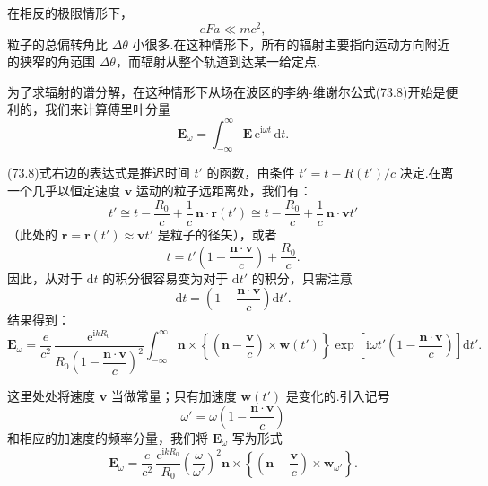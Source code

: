 在相反的极限情形下，
\begin{equation}
  eFa\ll mc^2,
\end{equation}
粒子的总偏转角比 $\Delta\theta$ 小很多.在这种情形下，所有的辐射主要指向运动方向附近的狭窄的角范围 $\Delta\theta$，而辐射从整个轨道到达某一给定点.

为了求辐射的谱分解，在这种情形下从场在波区的李纳-维谢尔公式(73.8)开始是便利的，我们来计算傅里叶分量
\begin{equation*}
  \boldsymbol{E}_{\omega}=\int_{-\infty}^{\infty}\boldsymbol{E}\,\mathrm{e}^{\mathrm{i}\omega t}\,\mathrm{d}t.
\end{equation*}

(73.8)式右边的表达式是推迟时间 $t'$ 的函数，由条件 $t'=t-R(t')/c$ 决定.在离一个几乎以恒定速度 $\boldsymbol{v}$ 运动的粒子远距离处，我们有：
\begin{equation*}
  t'\cong t-\frac{R_0}{c}+\frac{1}{c}\,\boldsymbol{n}\cdot\boldsymbol{r}(t')
  \cong t-\frac{R_0}{c}+\frac{1}{c}\,\boldsymbol{n}\cdot\boldsymbol{v}t'
\end{equation*}
（此处的 $\boldsymbol{r}=\boldsymbol{r}(t')\approx\boldsymbol{v}t'$ 是粒子的径矢），或者
\begin{equation*}
  t=t'\left(1-\frac{\boldsymbol{n}\cdot\boldsymbol{v}}{c}\right)+\frac{R_0}{c}.
\end{equation*}
因此，从对于 $\mathrm{d}t$ 的积分很容易变为对于 $\mathrm{d}t'$ 的积分，只需注意
\begin{equation*}
  \mathrm{d}t=\left(1-\frac{\boldsymbol{n}\cdot\boldsymbol{v}}{c}\right)\mathrm{d}t'.
\end{equation*}
结果得到：
\begin{equation*}
  \boldsymbol{E}_{\omega}=\frac{e}{c^2}\,
  \frac{\mathrm{e}^{\mathrm{i}kR_0}}{R_0\left(1-\dfrac{\boldsymbol{n}\cdot\boldsymbol{v}}{c}\right)^{\!2}}
  \int_{-\infty}^{\infty}\boldsymbol{n}\times\left\{\left(\boldsymbol{n}-\frac{\boldsymbol{v}}{c}\right)\times\boldsymbol{w}(t')\right\}
  \exp\!\left[\mathrm{i}\omega t'\left(1-\frac{\boldsymbol{n}\cdot\boldsymbol{v}}{c}\right)\right]\mathrm{d}t'.
\end{equation*}

这里处处将速度 $\boldsymbol{v}$ 当做常量；只有加速度 $\boldsymbol{w}(t')$ 是变化的.引入记号
\begin{equation}
  \omega'=\omega\left(1-\frac{\boldsymbol{n}\cdot\boldsymbol{v}}{c}\right)
\end{equation}
和相应的加速度的频率分量，我们将 $\boldsymbol{E}_{\omega}$ 写为形式
\begin{equation*}
  \boldsymbol{E}_{\omega}=\frac{e}{c^2}\,\frac{\mathrm{e}^{\mathrm{i}kR_0}}{R_0}
  \left(\frac{\omega}{\omega'}\right)^{\!2}
  \boldsymbol{n}\times\left\{\left(\boldsymbol{n}-\frac{\boldsymbol{v}}{c}\right)\times\boldsymbol{w}_{\omega'}\right\}.
\end{equation*}

